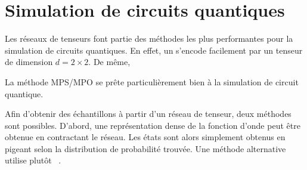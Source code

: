 
\section{Simulation de circuits quantiques}
\label{sec:simulation-de-circuits-quantiques}

Les réseaux de tenseurs font partie des méthodes les plus performantes pour la simulation de circuits quantiques. En effet, un s'encode facilement par un tenseur de dimension $d = 2 \times 2$. De même, 

La méthode MPS/MPO se prête particulièrement bien à la simulation de circuit quantique. 

Afin d'obtenir des échantillons à partir d'un réseau de tenseur, deux méthodes sont possibles. D'abord, une représentation dense de la fonction d'onde peut être obtenue en contractant le réseau. Les états sont alors simplement obtenus en pigeant selon la distribution de probabilité trouvée. Une méthode alternative utilise plutôt ~\cite{ferrisPerfectSamplingUnitary2012}. 






